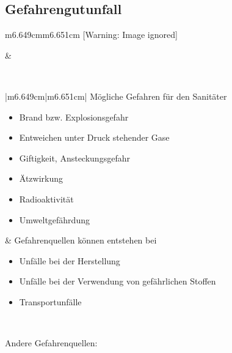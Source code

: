 \documentclass{article}
\begin{document}
\subsection{Gefahrengutunfall}
\begin{center}
\tablehead{}\begin{supertabular}{m{6.649cm}m{6.651cm}}
  [Warning: Image ignored] %
 

 &
 \par

\\
\end{supertabular}
\end{center}
\begin{center}
\tablehead{}\begin{supertabular}{|m{6.649cm}|m{6.651cm}|}
\hline
M\"ogliche Gefahren f\"ur den Sanit\"ater

\begin{itemize}
\item Brand bzw. Explosionsgefahr

\item Entweichen unter Druck stehender Gase

\item Giftigkeit, Ansteckungsgefahr

\item \"Atzwirkung

\item Radioaktivit\"at

\item Umweltgef\"ahrdung

\end{itemize}
 &
Gefahrenquellen k\"onnen entstehen bei

\begin{itemize}
\item Unf\"alle bei der Herstellung

\item Unf\"alle bei der Verwendung von gef\"ahrlichen Stoffen

\item Transportunf\"alle

\end{itemize}
\\\hline
\end{supertabular}
\end{center}
Andere Gefahrenquellen:
\end{document}
